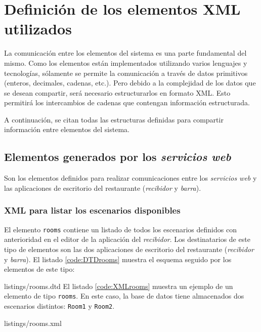 \chapter{Definición de los elementos \acs{XML} utilizados}
\label{chap:xmls}
La comunicación entre los elementos del sistema es una parte fundamental del
mismo. Como los elementos están implementados utilizando varios lenguajes y
tecnologías, sólamente se permite la comunicación a través de datos primitivos
(enteros, decimales, cadenas, etc.). Pero debido a la complejidad de los datos
que se desean compartir, será necesario estructurarlos en formato \acs{XML}. 
Esto permitirá los intercambios de cadenas que contengan información
estructurada.

A continuación, se citan todas las estructuras definidas para compartir
información entre elementos del sistema.

\section{Elementos generados por los \emph{servicios web}}
Son los elementos definidos para realizar comunicaciones entre los
\emph{servicios web} y las aplicaciones de escritorio del restaurante
(\emph{recibidor} y \emph{barra}).
\subsection{\acs{XML} para listar los escenarios disponibles}
El elemento \texttt{rooms} contiene un listado de todos los escenarios 
definidos con anterioridad en el editor de la aplicación del \emph{recibidor}. 
Los destinatarios de este tipo de elementos son las dos aplicaciones de 
escritorio del restaurante (\emph{recibidor} y \emph{barra}). El listado
\ref{code:DTDrooms} muestra el esquema seguido por los elementos de este tipo:

{listings/rooms.dtd}
El listado \ref{code:XMLrooms} muestra un ejemplo de un elemento de tipo
\texttt{rooms}. En este caso, la base de datos tiene almacenados dos
escenarios distintos: \texttt{Room1} y \texttt{Room2}.

{listings/rooms.xml}

